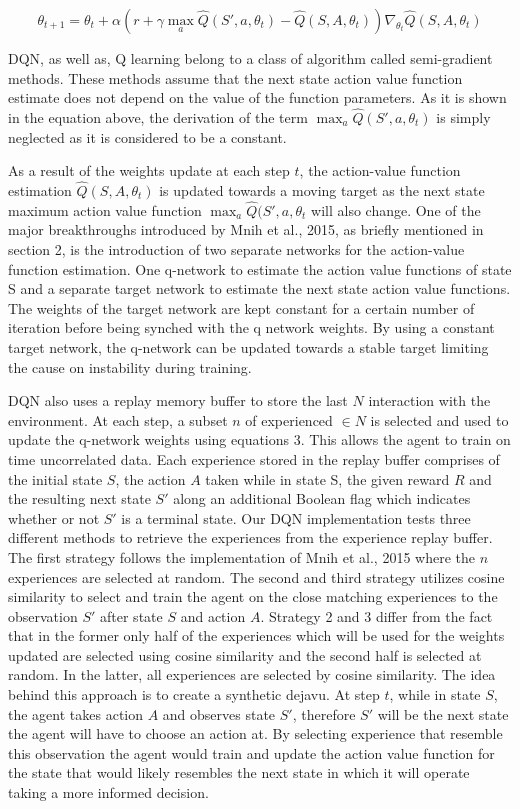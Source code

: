 \documentclass{article}
\begin{document}
\begin{equation}
\theta_{t+1} = \theta_{t} + \alpha \left( r + \gamma \max_{a} \hat{Q}(S',a,\theta_{t}) - \hat{Q}(S,A,\theta_{t}) \right) \nabla_{\theta_{t}} \hat{Q}(S,A,\theta_{t})
\end{equation}

DQN, as well as, Q learning belong to a class of algorithm called semi-gradient methods. These methods assume that the next state action value function estimate does not depend on the value of the function parameters. As it is shown in the equation above, the derivation of the term $\max_{a} \hat{Q}(S',a,\theta_{t}) $ is simply neglected as it is considered to be a constant.

As a result of the weights update at each step $t$, the action-value function estimation $\hat{Q}(S, A,\theta_{t})$ is updated towards a moving target as the next state maximum action value function $\max_{a} \hat{Q}(S',a,\theta_{t}$ will also change. One of the major breakthroughs introduced by Mnih et al., 2015, as briefly mentioned in section 2, is the introduction of two separate networks for the action-value function estimation. One q-network to estimate the action value functions of state S and a separate target network to estimate the next state action value functions. The weights of the target network are kept constant for a certain number of iteration before being synched with the q network weights. By using a constant target network, the q-network can be updated towards a stable target limiting the cause on instability during training.

DQN also uses a replay memory buffer to store the last $N$ interaction with the environment. At each step, a subset $n$ of experienced $\in N $ is selected and used to update the q-network weights using equations 3. This allows the agent to train on time uncorrelated data. Each experience stored in the replay buffer comprises of the initial state $S$, the action $A$ taken while in state S, the given reward $R$ and the resulting next state $S'$ along an additional Boolean flag which indicates whether or not $S'$ is a terminal state. Our DQN implementation tests three different methods to retrieve the experiences from the experience replay buffer. The first strategy follows the implementation of Mnih et al., 2015 where the $n$ experiences are selected at random. The second and third strategy utilizes cosine similarity to select and train the agent on the close matching experiences to the observation $S'$ after state $S$ and action $A$. Strategy 2 and 3 differ from the fact that in the former only half of the experiences which will be used for the weights updated are selected using cosine similarity and the second half is selected at random. In the latter, all experiences are selected by cosine similarity. The idea behind this approach is to create a synthetic dejavu. At step $t$, while in state $S$, the agent takes action $A$ and observes state $S'$, therefore $S'$ will be the next state the agent will have to choose an action at. By selecting experience that resemble this observation the agent would train and update the action value function for the state that would likely resembles the next state in which it will operate taking a more informed decision.
\end{document}

